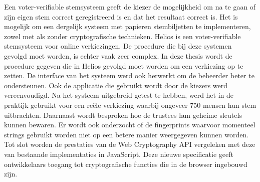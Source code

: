 % 
%

Een voter-verifiable stemsysteem geeft de kiezer de mogelijkheid om na te gaan of zijn eigen stem correct geregistreerd is en dat het resultaat correct is. Het is mogelijk om een dergelijk systeem met papieren stembiljetten te implementeren, zowel met als zonder cryptografische technieken. Helios is een voter-verifiable stemsysteem voor online verkiezingen. De procedure die bij deze systemen gevolgd moet worden, is echter vaak zeer complex. In deze thesis wordt de procedure gegeven die in Helios gevolgd moet worden om een verkiezing op te zetten. De interface van het systeem werd ook herwerkt om de beheerder beter te ondersteunen. Ook de applicatie die gebruikt wordt door de kiezers werd vereenvoudigd. Na het systeem uitgebreid getest te hebben, werd het in de praktijk gebruikt voor een re\"ele verkiezing waarbij ongeveer 750 mensen hun stem uitbrachten. Daarnaast wordt besproken hoe de trustees hun geheime sleutels kunnen bewaren. Er wordt ook onderzocht of de fingerprints waarvoor momenteel strings gebruikt worden niet op een betere manier weergegeven kunnen worden. Tot slot worden de prestaties van de Web Cryptography API vergeleken met deze van bestaande implementaties in JavaScript. Deze nieuwe specificatie geeft ontwikkelaars toegang tot cryptografische functies die in de browser ingebouwd zijn.